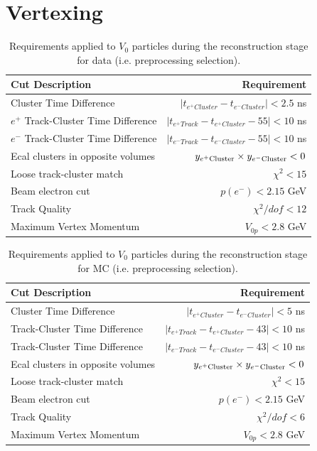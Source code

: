 \clearpage

\section{Vertexing}

\begin{table}[t] 
    \centering
    \begin{tabular}{lr}
        \toprule
        \textbf{Cut Description} & \textbf{Requirement} \\
        \midrule
        Cluster Time Difference & $|t_{e^+ Cluster}-t_{e^- Cluster}|<2.5$ ns\\
        $e^{+}$ Track-Cluster Time Difference & $|t_{e^+ Track}-t_{e^+ Cluster} - 55| < 10$ ns\\
        $e^{-}$ Track-Cluster Time Difference & $|t_{e^- Track}-t_{e^- Cluster} - 55| < 10$ ns\\
        Ecal clusters in opposite volumes 
        	& $y_{e^{+} \mathrm{ Cluster}} \times y_{e^{-} \mathrm{ Cluster}} < 0$ \\
        Loose track-cluster match & $\chi^2 < 15$  \\
        Beam electron cut & $p(e^{-}) < 2.15$ GeV \\
        Track Quality & $\chi^2/dof < 12$ \\
        Maximum Vertex Momentum & $V_{0p} < 2.8$ GeV \\ 
        \bottomrule
    \end{tabular}
    \caption{Requirements applied to $V_{0}$ particles during the 
    		 reconstruction stage for data (i.e. preprocessing selection).}
    \label{tab:mouse_data}
\end{table}

\begin{table}[t] 
    \centering
    \begin{tabular}{lr}
        \toprule
        \textbf{Cut Description} & \textbf{Requirement} \\
        \midrule
        Cluster Time Difference & $|t_{e^+ Cluster}-t_{e^- Cluster}|<5$ ns\\
        Track-Cluster Time Difference & $|t_{e^+ Track}-t_{e^+ Cluster} - 43| < 10$ ns\\
        Track-Cluster Time Difference & $|t_{e^- Track}-t_{e^- Cluster} - 43| < 10$ ns\\
        Ecal clusters in opposite volumes 
        	& $y_{e^{+} \mathrm{ Cluster}} \times y_{e^{-} \mathrm{ Cluster}} < 0$ \\
        Loose track-cluster match & $\chi^2 < 15$  \\
        Beam electron cut & $p(e^{-}) < 2.15$ GeV \\
        Track Quality & $\chi^2/dof < 6$ \\
        Maximum Vertex Momentum & $V_{0p} < 2.8$ GeV \\ 
        \bottomrule
    \end{tabular}
    \caption{Requirements applied to $V_{0}$ particles during the 
    		 reconstruction stage for MC (i.e. preprocessing selection).}
    \label{tab:mouse_mc}
\end{table}

